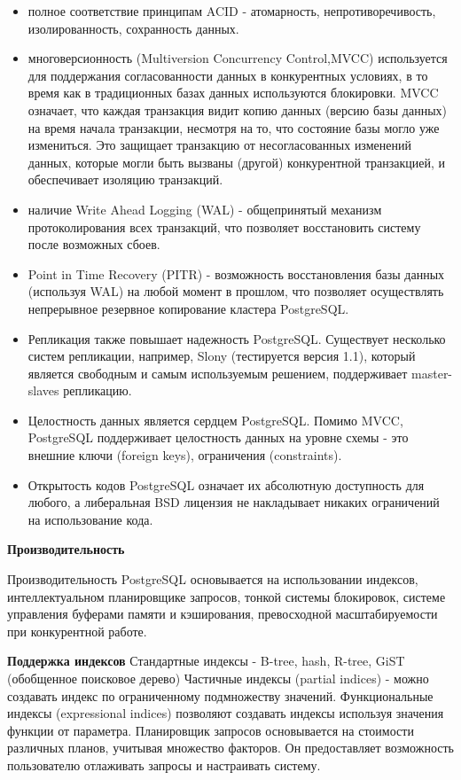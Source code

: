 \begin{itemize}
  \item  полное соответствие принципам ACID - атомарность, непротиворечивость, изолированность, сохранность данных.
  \item  многоверсионность (Multiversion Concurrency Control,MVCC) используется для поддержания согласованности данных в конкурентных условиях, в то время как в традиционных базах данных используются блокировки. MVCC означает, что каждая транзакция видит копию данных (версию базы данных) на время начала транзакции, несмотря на то, что состояние базы могло уже измениться. Это защищает транзакцию от несогласованных изменений данных, которые могли быть вызваны (другой) конкурентной транзакцией, и обеспечивает изоляцию транзакций.
  \item наличие Write Ahead Logging (WAL) - общепринятый механизм протоколирования всех транзакций, что позволяет восстановить систему после возможных сбоев.
  \item Point in Time Recovery (PITR) - возможность восстановления базы данных (используя WAL) на любой момент в прошлом, что позволяет осуществлять непрерывное резервное копирование кластера PostgreSQL.
  \item Репликация также повышает надежность PostgreSQL. Существует несколько систем репликации, например, Slony (тестируется версия 1.1), который является свободным и самым используемым решением, поддерживает master-slaves репликацию.
  \item Целостность данных является сердцем PostgreSQL. Помимо MVCC, PostgreSQL поддерживает целостность данных на уровне схемы - это внешние ключи (foreign keys), ограничения (constraints).
  \item Открытость кодов PostgreSQL означает их абсолютную доступность для любого, а либеральная BSD лицензия не накладывает никаких ограничений на использование кода.
\end{itemize}

\textbf{Производительность}

Производительность PostgreSQL основывается на использовании индексов, интеллектуальном планировщике запросов, тонкой системы блокировок, системе управления буферами памяти и кэширования, превосходной масштабируемости при конкурентной работе.

\textbf{Поддержка индексов} 
Стандартные индексы - B-tree, hash, R-tree, GiST (обобщенное поисковое дерево)
Частичные индексы (partial indices) - можно создавать индекс по ограниченному подмножеству значений.
Функциональные индексы (expressional indices) позволяют создавать индексы используя значения функции от параметра.
Планировщик запросов основывается на стоимости различных планов, учитывая множество факторов. Он предоставляет возможность пользователю отлаживать запросы и настраивать систему.

